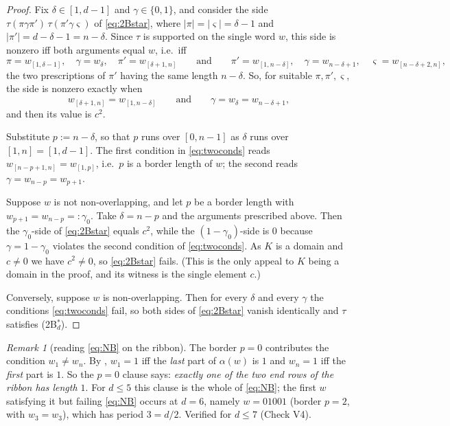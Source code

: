 \documentclass[11pt]{article}
\theoremstyle{definition}
\theoremstyle{remark}
\newtheorem{remark}[theorem]{Remark}
\newcommand{\cube}{\{0,1\}}
\begin{document}
\begin{proof}
Fix $\delta\in[1,d-1]$ and $\gamma\in\cube$, and consider the side
$\tau(\pi\gamma\pi')\,\tau(\pi'\gamma\varsigma)$ of \eqref{eq:2Bstar}, where
$|\pi|=|\varsigma|=\delta-1$ and $|\pi'|=d-\delta-1=n-\delta$.  Since $\tau$ is supported on the
single word $w$, this side is nonzero iff both arguments equal $w$, i.e.\ iff
\[
   \pi=w_{[1,\delta-1]},\quad \gamma=w_\delta,\quad \pi'=w_{[\delta+1,n]}
   \qquad\text{and}\qquad
   \pi'=w_{[1,n-\delta]},\quad \gamma=w_{n-\delta+1},\quad \varsigma=w_{[n-\delta+2,n]},
\]
the two prescriptions of $\pi'$ having the same length $n-\delta$.  So, for suitable
$\pi,\pi',\varsigma$, the side is nonzero exactly when
\begin{equation}\label{eq:twoconds}
  w_{[\delta+1,n]}=w_{[1,n-\delta]}
  \qquad\text{and}\qquad
  \gamma=w_\delta=w_{n-\delta+1},
\end{equation}
and then its value is $c^2$.

Substitute $p:=n-\delta$, so that $p$ runs over $[0,n-1]$ as $\delta$ runs over $[1,n]=[1,d-1]$.
The first condition in \eqref{eq:twoconds} reads $w_{[n-p+1,n]}=w_{[1,p]}$, i.e.\ $p$ is a
border length of $w$; the second reads $\gamma=w_{n-p}=w_{p+1}$.

Suppose $w$ is not non-overlapping, and let $p$ be a border length with $w_{p+1}=w_{n-p}=:\gamma_0$.
Take $\delta=n-p$ and the arguments prescribed above.  Then the $\gamma_0$-side of
\eqref{eq:2Bstar} equals $c^2$, while the $(1-\gamma_0)$-side is $0$ because
$\gamma=1-\gamma_0$ violates the second condition of \eqref{eq:twoconds}.  As $K$ is a domain
and $c\ne0$ we have $c^2\ne0$, so \eqref{eq:2Bstar} fails.  (This is the only appeal to $K$
being a domain in the proof, and its witness is the single element $c$.)

Conversely, suppose $w$ is non-overlapping.  Then for every $\delta$ and every $\gamma$ the
conditions \eqref{eq:twoconds} fail, so both sides of \eqref{eq:2Bstar} vanish identically and
$\tau$ satisfies \textnormal{(2B$^*_d$)}.
\end{proof}

\begin{remark}[reading \eqref{eq:NB} on the ribbon]\label{rem:endrows}
The border $p=0$ contributes the condition $w_1\ne w_n$.  By \cite[Lemma 1.3]{Q149}, $w_1=1$ iff
the \emph{last} part of $\alpha(w)$ is $1$ and $w_{n}=1$ iff the \emph{first} part is $1$.  So
the $p=0$ clause says: \emph{exactly one of the two end rows of the ribbon has length $1$}.
For $d\le5$ this clause is the whole of \eqref{eq:NB}; the first $w$ satisfying it but failing
\eqref{eq:NB} occurs at $d=6$, namely $w=01001$ (border $p=2$, with $w_3=w_3$), which has
period $3=d/2$.  Verified for $d\le7$ (Check V4).
\end{remark}
\end{document}
